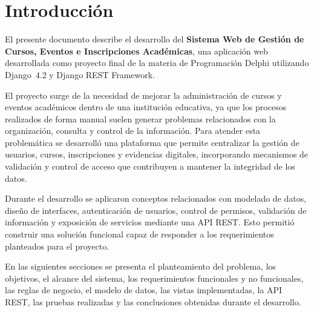 \documentclass[11pt,letterpaper]{article}
\begin{document}
	\section{Introducci\'on}
	El presente documento describe el desarrollo del \textbf{Sistema Web de Gesti\'on de Cursos, Eventos e Inscripciones Acad\'emicas}, una aplicaci\'on web desarrollada como proyecto final de la materia de Programaci\'on Delphi utilizando Django~4.2 y Django REST Framework.
	
	El proyecto surge de la necesidad de mejorar la administraci\'on de cursos y eventos acad\'emicos dentro de una instituci\'on educativa, ya que los procesos realizados de forma manual suelen generar problemas relacionados con la organizaci\'on, consulta y control de la informaci\'on. Para atender esta problem\'atica se desarroll\'o una plataforma que permite centralizar la gesti\'on de usuarios, cursos, inscripciones y evidencias digitales, incorporando mecanismos de validaci\'on y control de acceso que contribuyen a mantener la integridad de los datos.
	
	Durante el desarrollo se aplicaron conceptos relacionados con modelado de datos, dise\~no de interfaces, autenticaci\'on de usuarios, control de permisos, validaci\'on de informaci\'on y exposici\'on de servicios mediante una API REST. Esto permiti\'o construir una soluci\'on funcional capaz de responder a los requerimientos planteados para el proyecto.
	
	En las siguientes secciones se presenta el planteamiento del problema, los objetivos, el alcance del sistema, los requerimientos funcionales y no funcionales, las reglas de negocio, el modelo de datos, las vistas implementadas, la API REST, las pruebas realizadas y las conclusiones obtenidas durante el desarrollo.
		
\end{document}

